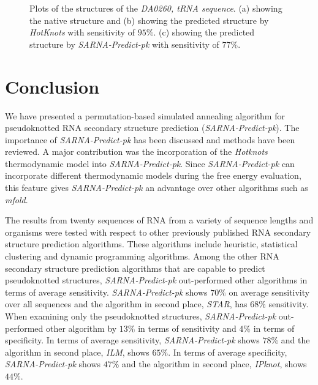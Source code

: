 \documentclass{doublecol-new}
\theoremstyle{TH}{
\newtheorem{lemma}{Lemma}
\newtheorem{theorem}[lemma]{Theorem}
\newtheorem{corrolary}[lemma]{Corrolary}
\newtheorem{conjecture}[lemma]{Conjecture}
\newtheorem{proposition}[lemma]{Proposition}
\newtheorem{claim}[lemma]{Claim}
\newtheorem{stheorem}[lemma]{Wrong Theorem}
\newtheorem{algorithm}{Algorithm}
}
\theoremstyle{THrm}{
\newtheorem{definition}{Definition}
\newtheorem{question}{Question}
\newtheorem{remark}{Remark}
\newtheorem{scheme}{Scheme}
}
\theoremstyle{THhit}{
\newtheorem{case}{Case}[section]
}
\begin{document}
{{\begin{figure}
     \caption{Plots of the structures of the {\em DA0260, tRNA sequence}.
                (a) showing the native structure and
                (b) showing the predicted structure by {\em HotKnots} with sensitivity of $95\%$.
                (c) showing the predicted structure by {\em SARNA-Predict-pk} with sensitivity of $77\%$. }
  \label{fig:graph_percentageComparison_DA0260}
\end{figure}



\section{Conclusion}
We have presented a permutation-based simulated annealing algorithm for
pseudoknotted RNA secondary structure prediction ({\em SARNA-Predict-pk}).
The importance of {\em SARNA-Predict-pk} has been
discussed and methods have been reviewed.
A major contribution was the incorporation of the \emph{Hotknots} thermodynamic model
into {\em SARNA-Predict-pk}.
Since {\em SARNA-Predict-pk} can incorporate different thermodynamic models
during the free energy evaluation, this feature gives {\em SARNA-Predict-pk} 
an advantage over 
other algorithms such as {\em mfold}.

The results from twenty sequences of RNA from a variety of sequence lengths and organisms were tested
with respect to other previously published RNA secondary structure prediction algorithms.
These algorithms include heuristic, statistical clustering and dynamic programming algorithms.
Among the other RNA secondary structure prediction algorithms that are capable to predict
pseudoknotted structures,
{\em SARNA-Predict-pk} out-performed other algorithms in terms of average sensitivity.
{\em SARNA-Predict-pk} shows $70\%$ on average sensitivity over all sequences and
the algorithm in second place, {\em STAR}, has $68\%$ sensitivity.
When examining only the pseudoknotted structures, {\em SARNA-Predict-pk}
out-performed other algorithm by $13\%$ in terms of sensitivity and $4\%$ in terms of specificity.
In terms of average sensitivity, {\em SARNA-Predict-pk} shows $78\%$ and
the algorithm in second place, {\em ILM}, shows $65\%$.
In terms of average specificity, {\em SARNA-Predict-pk} shows $47\%$ and
the algorithm in second place, {\em IPknot}, shows $44\%$.

}}
\end{document}
